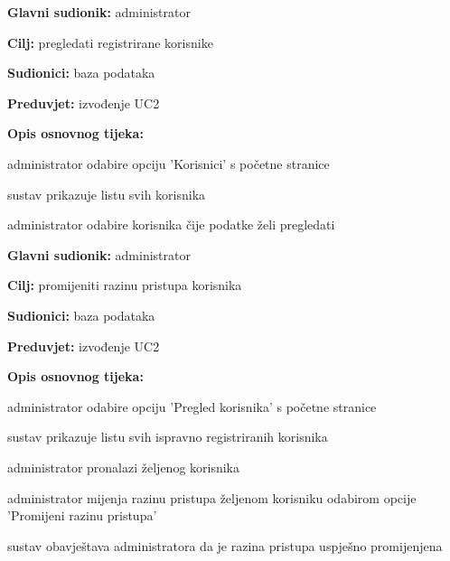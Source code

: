                     \noindent {}
					\begin{packed_item}
	
						\item \textbf{Glavni sudionik: }administrator
						\item  \textbf{Cilj:} pregledati registrirane korisnike
						\item  \textbf{Sudionici:} baza podataka
						\item  \textbf{Preduvjet:} izvođenje UC2
						\item  \textbf{Opis osnovnog tijeka:}
						
						\item[] \begin{packed_enum}
	
							\item administrator odabire opciju 'Korisnici' s početne stranice
							\item sustav prikazuje listu svih korisnika
							\item administrator odabire korisnika čije podatke želi pregledati

						\end{packed_enum}
					\end{packed_item}


                    \noindent {}
					\begin{packed_item}
	
						\item \textbf{Glavni sudionik: }administrator
						\item  \textbf{Cilj:} promijeniti razinu pristupa korisnika
						\item  \textbf{Sudionici:} baza podataka
						\item  \textbf{Preduvjet:} izvođenje UC2
						\item  \textbf{Opis osnovnog tijeka:}
						
						\item[] \begin{packed_enum}
							\item administrator odabire opciju 'Pregled korisnika' s početne stranice
							\item sustav prikazuje listu svih ispravno registriranih korisnika
							\item administrator pronalazi željenog korisnika
							\item administrator mijenja razinu pristupa željenom korisniku odabirom opcije 'Promijeni razinu pristupa'
							\item sustav obavještava administratora da je razina pristupa uspješno promijenjena
                        
						\end{packed_enum}
					\end{packed_item}
        
